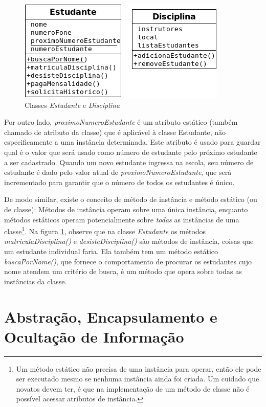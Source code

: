 \begin{figure}[h]
\begin{center}
\includegraphics[scale=0.85]{class1.png} 
\caption{Classes \emph{Estudante} e \emph{Disciplina}} \label{fig:class1}
\end{center}
\end{figure}

Por outro lado, \emph{proximoNumeroEstudante} é um atributo estático (também chamado de atributo da classe) que é aplicável à classe Estudante, não especificamente a uma instância determinada. Este atributo é usado para guardar qual é o valor que será usado como número de estudante pelo próximo estudante a ser cadastrado. Quando um novo estudante ingressa na escola, seu número de estudante é dado pelo valor atual de \emph{proximoNumeroEstudante}, que será incrementado para garantir que o número de todos os estudantes é único.

De modo similar, existe o conceito de método de instância e método estático (ou de classe): Métodos de instância operam sobre uma única instância, enquanto métodos estáticos operam potencialmente sobre \textit{todas} as instâncias de uma classe\footnote{Um método estático não precisa de uma instância para operar, então ele pode ser executado mesmo se nenhuma instância ainda foi criada. Um cuidado que novatos devem ter, é que na implementação de um método de classe não é possível acessar atributos de instância.}. Na figura \ref{fig:class1}, observe que na classe \emph{Estudante} os métodos \emph{matriculaDisciplina()} e \emph{desisteDisciplina()} são métodos de instância, coisas que um estudante individual faria. Ela também tem um método estático \emph{buscaPorNome()}, que fornece o comportamento de procurar os estudantes cujo nome atendem um critério de busca, é um método que opera sobre todas as instâncias da classe.

\section{Abstração, Encapsulamento e Ocultação de Informação}

